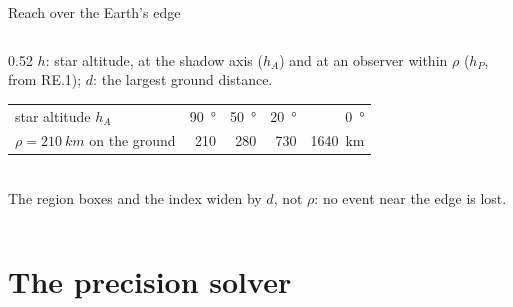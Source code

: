 \begin{frame}{Reach over the Earth's edge}
\begin{columns}[c]
\begin{column}{0.52\textwidth}
      {\scriptsize $h$: star altitude, at the shadow axis ($h_A$) and at an observer within $\rho$ ($h_P$, from RE.1);
      $d$: the largest ground distance.}\\[0.5ex]
      \begin{tabular}{@{}lrrrr@{}}
        star altitude $h_A$ & \SI{90}{\degree} & \SI{50}{\degree} & \SI{20}{\degree} & \SI{0}{\degree}\\
        $\rho = \SI{210}{km}$ on the ground & 210 & 280 & 730 & \SI{1640}{km}
      \end{tabular}\\[0.5ex]
      {\scriptsize The region boxes and the index widen by $d$, not $\rho$: no event near the edge is lost.}
    \end{column}
  \end{columns}
\end{frame}

\section{The precision solver}

